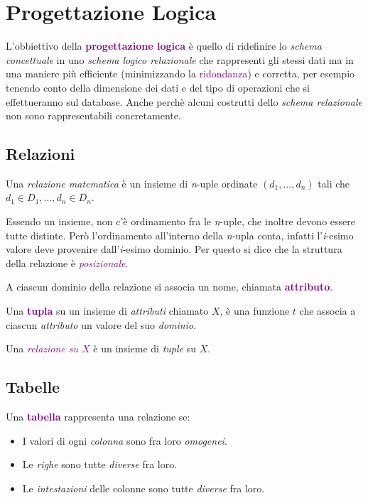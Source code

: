 \section{Progettazione Logica}
L'obbiettivo della \textbf{\textcolor{purple}{progettazione logica}} è quello di ridefinire lo \emph{schema concettuale}
in uno \emph{schema logico relazionale} che rappresenti gli stessi dati ma in una maniere più efficiente 
(minimizzando la \textcolor{purple}{ridondanza}) e corretta, per esempio tenendo conto della dimensione dei dati e del
tipo di operazioni che si effettueranno sul database. Anche perchè alcuni costrutti dello 
\emph{schema relazionale} non sono rappresentabili concretamente.

\subsection{Relazioni}

\begin{definition}
    Una \emph{relazione matematica} è un insieme di \emph{n}-uple ordinate
    $(d_1, \dots, d_n)$ tali che $d_1 \in D_1, \dots, d_n \in D_n$.

    Essendo un insieme, non c'è ordinamento fra le \emph{n}-uple, che inoltre devono essere
    tutte distinte. Però l'ordinamento all'interno della \emph{n}-upla conta, infatti l'\emph{i}-esimo
    valore deve provenire dall'\emph{i}-esimo dominio. Per questo si dice che la struttura della relazione
    è \emph{\textcolor{purple}{posizionale}}.
\end{definition}

\begin{definition}[Attributo]
    A ciascun dominio della relazione si associa un nome, chiamata \textbf{\textcolor{purple}{attributo}}.
\end{definition}

\begin{definition}[Tupla]
    Una \textbf{\textcolor{purple}{tupla}} su un insieme di \emph{attributi} chiamato $X$, è una funzione
    $t$ che associa a ciascun \emph{attributo} un valore del suo \emph{dominio}.

    Una \emph{\textcolor{purple}{relazione su $X$}} è un insieme di \emph{tuple}
    su $X$.
\end{definition}

\subsection{Tabelle}
Una \textbf{\textcolor{purple}{tabella}} rappresenta una relazione se:
\begin{itemize}
    \item I valori di ogni \emph{colonna} sono fra loro \emph{omogenei}.
    \item Le \emph{righe} sono tutte \emph{diverse} fra loro.
    \item Le \emph{intestazioni} delle colonne sono tutte \emph{diverse} fra loro.
\end{itemize}

